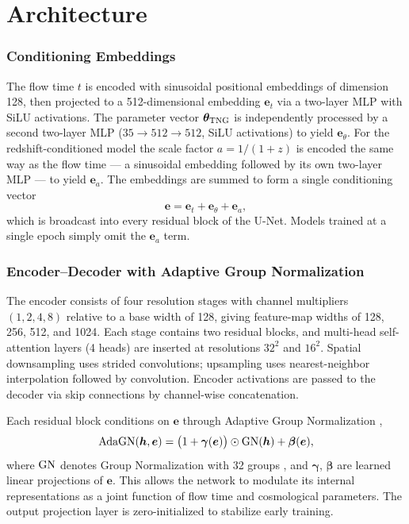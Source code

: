 \documentclass[linenumbers,trackchanges, twocolumn]{aastex701}
\begin{document}
\appendix

\section{Architecture}\label{appendix:architecture}
\subsubsection{Conditioning Embeddings}

The flow time $t$ is encoded with sinusoidal positional embeddings
\citep{dhariwal2021diffusion} of dimension 128, then projected to a
512-dimensional embedding $\bm{e}_t$ via a two-layer MLP with SiLU
activations. The parameter vector $\boldsymbol{\theta}_{\rm TNG}$ is
independently processed by a second two-layer MLP ($35 \to 512 \to
512$, SiLU activations) to yield $\bm{e}_\theta$. For the
redshift-conditioned model the scale factor $a = 1/(1+z)$ is encoded the same
way as the flow time --- a sinusoidal embedding followed by its own two-layer
MLP --- to yield $\bm{e}_a$. The embeddings are summed to form a single
conditioning vector
\begin{equation}
    \bm{e} = \bm{e}_t + \bm{e}_\theta + \bm{e}_a,
    \label{eq:embedding}
\end{equation}
which is broadcast into every residual block of the U-Net. Models trained at a
single epoch simply omit the $\bm{e}_a$ term.

\subsubsection{Encoder--Decoder with Adaptive Group Normalization}

The encoder consists of four resolution stages with channel
multipliers $(1,2,4,8)$ relative to a base width of 128, giving
feature-map widths of 128, 256, 512, and 1024. Each stage contains
two residual blocks, and multi-head self-attention layers (4 heads) are
inserted at resolutions $32^2$ and $16^2$. Spatial downsampling uses
strided convolutions; upsampling uses nearest-neighbor interpolation
followed by convolution. Encoder activations are passed to the decoder
via skip connections by channel-wise concatenation.

Each residual block conditions on $\bm{e}$ through Adaptive Group
Normalization \citep{dhariwal2021diffusion},
\begin{equation}
    {\rm AdaGN}(\bm{h},\bm{e})
    =
    \bigl(1 + \boldsymbol{\gamma}(\bm{e})\bigr)
    \odot {\rm GN}(\bm{h})
    + \boldsymbol{\beta}(\bm{e}),
    \label{eq:adagn}
\end{equation}
where ${\rm GN}$ denotes Group Normalization with 32 groups
\citep{wu2018groupnorm}, and $\boldsymbol{\gamma}$,
$\boldsymbol{\beta}$ are learned linear projections of $\bm{e}$.
This allows the network to modulate its internal representations as a
joint function of flow time and cosmological parameters. The output
projection layer is zero-initialized to stabilize early training.
\end{document}

